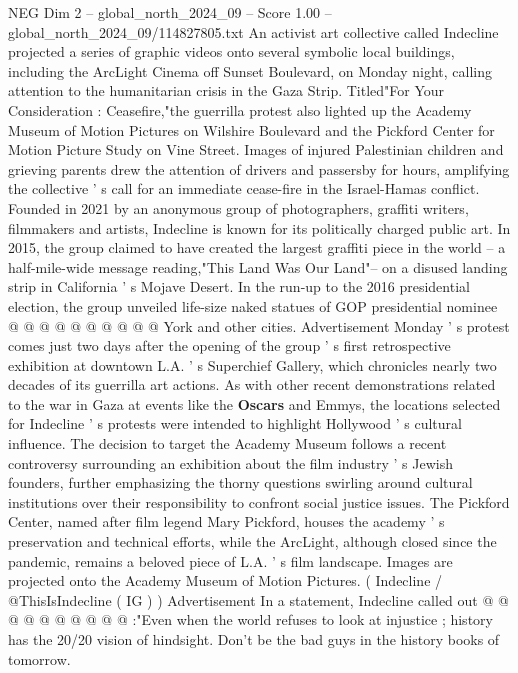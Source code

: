 \begin{textsample}{NEG Dim 2 – global\_north\_2024\_09 – Score 1.00 – global\_north\_2024\_09/114827805.txt}  \label{ex:f2_neg_320}
An activist art collective called Indecline projected a series of graphic videos onto several symbolic local buildings, including the ArcLight Cinema off Sunset Boulevard, on Monday night, calling attention to the humanitarian crisis in the Gaza Strip.
Titled"For Your Consideration : Ceasefire,"the guerrilla protest also lighted up the Academy Museum of Motion Pictures on Wilshire Boulevard and the Pickford Center for Motion Picture Study on Vine Street.
Images of injured Palestinian children and grieving parents drew the attention of drivers and passersby for hours, amplifying the collective ' s call for an immediate cease-fire in the Israel-Hamas conflict.
Founded in 2021 by an anonymous group of photographers, graffiti writers, filmmakers and artists, Indecline is known for its politically charged public art.
In 2015, the group claimed to have created the largest graffiti piece in the world -- a half-mile-wide message reading,"This Land Was Our Land"-- on a disused landing strip in California ' s Mojave Desert.
In the run-up to the 2016 presidential election, the group unveiled life-size naked statues of GOP presidential nominee @ @ @ @ @ @ @ @ @ @ York and other cities.
Advertisement Monday ' s protest comes just two days after the opening of the group ' s first retrospective exhibition at downtown L.A. ' s Superchief Gallery, which chronicles nearly two decades of its guerrilla art actions.
As with other recent demonstrations related to the war in Gaza at events like the \textbf{Oscars} and Emmys, the locations selected for Indecline ' s protests were intended to highlight Hollywood ' s cultural influence.
The decision to target the Academy Museum follows a recent controversy surrounding an exhibition about the film industry ' s Jewish founders, further emphasizing the thorny questions swirling around cultural institutions over their responsibility to confront social justice issues.
The Pickford Center, named after film legend Mary Pickford, houses the academy ' s preservation and technical efforts, while the ArcLight, although closed since the pandemic, remains a beloved piece of L.A. ' s film landscape.
Images are projected onto the Academy Museum of Motion Pictures. ( Indecline / @ThisIsIndecline ( IG ) ) Advertisement In a statement, Indecline called out @ @ @ @ @ @ @ @ @ @ :"Even when the world refuses to look at injustice ; history has the 20/20 vision of hindsight.
Don't be the bad guys in the history books of tomorrow.

\end{textsample}
